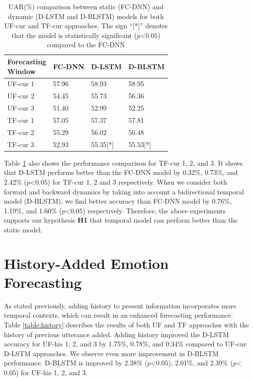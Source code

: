 \begin{table}[h]
\centering
\caption{UAR(\%) comparison between static (FC-DNN)  and dynamic  (D-LSTM and D-BLSTM) models for both UF-cur and TF-cur approaches. The sign ``[*]'' denotes that the model is statistically significant ($p$\textless$0.05$) compared to the FC-DNN}
\begin{tabular}{l  l  l  l}
\hline

\makecell{\textbf{Forecasting}\\\textbf{Window}} & \makecell{\textbf{FC-DNN}\\} &  \makecell{\textbf{D-LSTM}\\} & \makecell{\textbf{D-BLSTM}\\} \\
\hline
\hline
UF-cur 1 & 57.96 & 58.93 & 58.95 \\

UF-cur 2 & 54.45 & 55.73 & 56.36\\      

UF-cur 3 & 51.40 & 52.99 & 52.25\\
\hline
TF-cur 1 & 57.05 & 57.37 & 57.81 \\

TF-cur 2 & 55.29 & 56.02 & 56.48\\      

TF-cur 3 & 52.93 & 55.35[*] & 55.53[*]\\
\hline
\end{tabular}
\label{tab:history-less}
\end{table}

 Table \ref{tab:history-less} also shows the performance comparison for TF-cur 1, 2, and 3. It shows that D-LSTM performs better than the FC-DNN model by  0.32\%, 0.73\%, and 2.42\% ($p$\textless$0.05$) for TF-cur 1, 2 and 3 respectively. When we consider both forward and backward dynamics by taking into account a bidirectional temporal model (D-BLSTM), we find better accuracy than FC-DNN model by 0.76\%, 1.19\%, and 1.60\% ($p$\textless$0.05$) respectively.  Therefore, the above experiments supports our hypothesis \textbf{H1} that temporal model can perform better than the static model.




\section{History-Added Emotion Forecasting}
As stated previously, adding history to present information incorporates more temporal contexts, which can result in an enhanced forecasting performance. Table \ref{table:history} describes the results of both UF and TF approaches with the history of previous utterance added.  Adding history improved the D-LSTM accuracy for UF-his 1, 2, and 3 by 1.75\%, 0.78\%, and 0.34\% compared to UF-cur D-LSTM approaches. We observe even more improvement in D-BLSTM performance. D-BLSTM  is improved by 2.38\% ($p$\textless$0.05$), 2.01\%, and 2.39\% ($p$\textless$0.05$) for UF-his 1, 2, and 3. 

